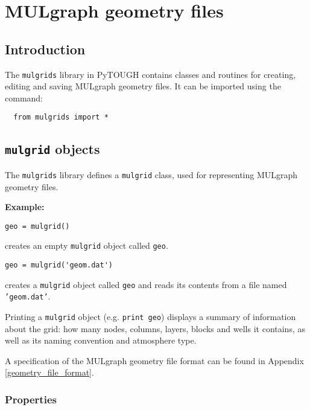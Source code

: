 \chapter{MULgraph geometry files}
\label{mulgrids}

\section{Introduction}
The \texttt{mulgrids} library in PyTOUGH contains classes and routines for creating, editing and saving MULgraph geometry files.  It can be imported using the command:

\begin{lstlisting}
  from mulgrids import *
\end{lstlisting}

\section{\texttt{mulgrid} objects}

The \texttt{mulgrids} library defines a \texttt{mulgrid} class, used for representing MULgraph geometry files.

\textbf{Example:}

\begin{lstlisting}
geo = mulgrid()
\end{lstlisting}

creates an empty \texttt{mulgrid} object called \texttt{geo}.

\begin{lstlisting}
geo = mulgrid('geom.dat')
\end{lstlisting}

creates a \texttt{mulgrid} object called \texttt{geo} and reads its contents from a file named \texttt{'geom.dat'}.

Printing a \texttt{mulgrid} object (e.g. \texttt{print geo}) displays a summary of information about the grid: how many nodes, columns, layers, blocks and wells it contains, as well as its naming convention and atmosphere type.

A specification of the MULgraph geometry file format can be found in Appendix \ref{geometry_file_format}.

\subsection{Properties}

